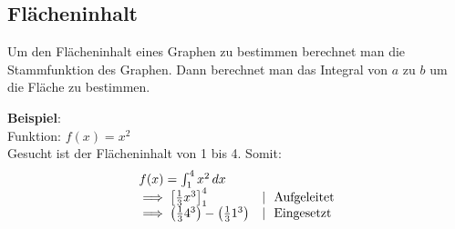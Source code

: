\subsection{Flächeninhalt}
Um den Flächeninhalt eines Graphen zu bestimmen berechnet man die Stammfunktion des Graphen. 
Dann berechnet man das Integral von $a$ zu $b$ um die Fläche zu bestimmen. 

\textbf{Beispiel}: \\
Funktion: 
$f(x) = x^2$ \\
Gesucht ist der Flächeninhalt von 1 bis 4. Somit: 
\[
\begin{array}{l l}
f(x) = \int_1^4 x^2 \, dx & \\
\implies \left[\frac{1}{3}x^3\right]_1^4 & |\ \text{ Aufgeleitet} \\
\implies \left(\frac{1}{3}4^3\right) - \left(\frac{1}{3}1^3\right) & |\ \text{ Eingesetzt}
\end{array}
\]

